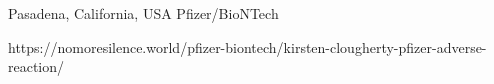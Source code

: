           {Pasadena, California, USA}
          {}
          {Pfizer/BioNTech}
          {}
          {
            
          }
          {https://nomoresilence.world/pfizer-biontech/kirsten-clougherty-pfizer-adverse-reaction/}


